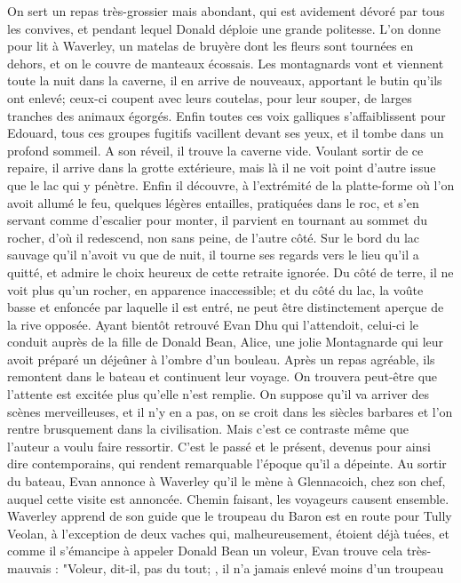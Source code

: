 On sert un repas très-grossier mais abondant, qui est avidement dévoré par tous les convives, et pendant lequel Donald déploie une grande politesse. L'on donne pour lit à Waverley, un matelas de bruyère dont les\setcounter{page}{109} fleurs sont tournées en dehors, et on le couvre de manteaux écossais. Les montagnards vont et viennent toute la nuit dans la caverne, il en arrive de nouveaux, apportant le butin qu'ils ont enlevé; ceux-ci coupent avec leurs coutelas, pour leur souper, de larges tranches des animaux égorgés. Enfin toutes ces voix galliques s'affaiblissent pour Edouard, tous ces groupes fugitifs vacillent devant ses yeux, et il tombe dans un profond sommeil. A son réveil, il trouve la caverne vide. Voulant sortir de ce repaire, il arrive dans la grotte extérieure, mais là il ne voit point d'autre issue que le lac qui y pénètre. Enfin il découvre, à l'extrémité de la platte-forme où l'on avoit allumé le feu, quelques légères entailles, pratiquées dans le roc, et s'en servant comme d'escalier pour monter, il parvient en tournant au sommet du rocher, d'où il redescend, non sans peine, de l'autre côté. Sur le bord du lac sauvage qu'il n'avoit vu que de nuit, il tourne ses regards vers le lieu qu'il a quitté, et admire le choix heureux de cette retraite ignorée. Du côté de terre, il ne voit plus qu'un rocher, en apparence inaccessible; et du côté du lac, la voûte basse et enfoncée par laquelle il est entré, ne peut être distinctement aperçue de la rive opposée.\setcounter{page}{110} Ayant bientôt retrouvé Evan Dhu qui l'attendoit, celui-ci le conduit auprès de la fille de Donald Bean, Alice, une jolie Montagnarde qui leur avoit préparé un déjeûner à l'ombre d'un bouleau. Après un repas agréable, ils remontent dans le bateau et continuent leur voyage.
On trouvera peut-être que l'attente est excitée plus qu'elle n'est remplie. On suppose qu'il va arriver des scènes merveilleuses, et il n'y en a pas, on se croit dans les siècles barbares et l'on rentre brusquement dans la civilisation. Mais c'est ce contraste même que l'auteur a voulu faire ressortir. C'est le passé et le présent, devenus pour ainsi dire contemporains, qui rendent remarquable l'époque qu'il a dépeinte.
Au sortir du bateau, Evan annonce à Waverley qu'il le mène à Glennacoich, chez son chef, auquel cette visite est annoncée. Chemin faisant, les voyageurs causent ensemble. Waverley apprend de son guide que le troupeau du Baron est en route pour Tully Veolan, à l'exception de deux vaches qui, malheureusement, étoient déjà tuées, et comme il s'émancipe à appeler Donald Bean un voleur, Evan trouve cela très-mauvais : "Voleur, dit-il, pas du tout;\setcounter{page}{111} , il n’a jamais enlevé moins d’un troupeau
